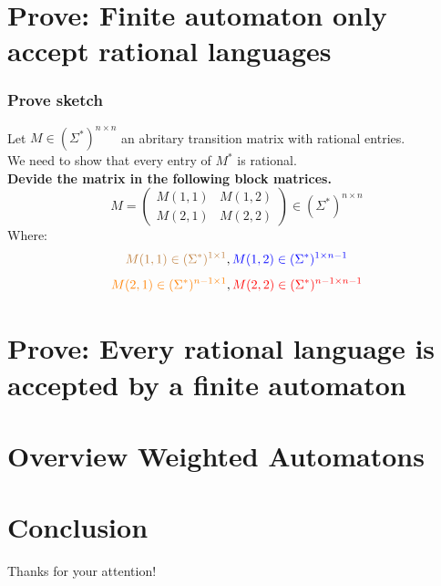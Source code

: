 \documentclass{beamer}
\begin{document}
\section{Prove: Finite automaton only accept rational languages}
\begin{frame}
  \frametitle{Prove sketch}
  Let $M \in (\Sigma^*)^{n\times n}$ an abritary transition matrix with rational
  entries.\\
  We need to show that every entry of $M^*$ is rational.\\
  {\bf Devide the matrix in the following block matrices.}\\
  \[M = 
    \begin{pmatrix}
      M(1,1) & M(1,2) \\
      M(2,1) & M(2,2)
    \end{pmatrix} 
    \in (\Sigma^*)^{n\times n}
  \]
  Where: \\
  \[
    \textcolor{brown}{M(1,1) \in (\Sigma^*)^{1\times 1}},
    \textcolor{blue}{M(1,2) \in (\Sigma^*)^{1\times n-1}}
  \]
  \[
    \textcolor{orange}{M(2,1) \in (\Sigma^*)^{n-1\times 1}},
    \textcolor{red}{M(2,2) \in (\Sigma^*)^{n-1\times n-1}}
  \]
  \begin{center}
  \end{center}
\end{frame}
\section{Prove: Every rational language is accepted by a finite automaton}
\section{Overview Weighted Automatons}
\section{Conclusion}




\begin{frame}
    \Huge{\centerline{Thanks for your attention!}}
    
\end{frame}





\end{document}
